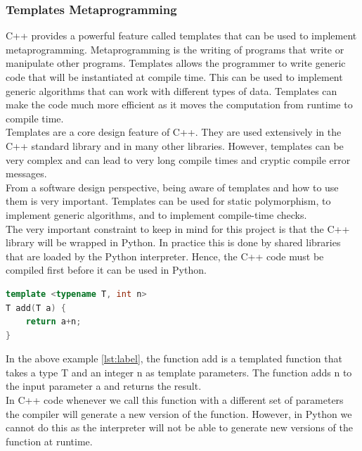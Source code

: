 \begin{spacing}{1.2}
    \subsubsection{Templates Metaprogramming}
    C++ provides a powerful feature called templates that can be used to implement metaprogramming.
    Metaprogramming is the writing of programs that write or manipulate other programs.
    Templates allows the programmer to write generic code that will be instantiated at compile time.
    This can be used to implement generic algorithms that can work with different types of data.
    Templates can make the code much more efficient as it moves the computation from runtime
    to compile time. \\

    Templates are a core design feature of C++. They are used extensively in the C++ standard
    library and in many other libraries. However, templates can be very complex and can lead to
    very long compile times and cryptic compile error messages.\\

    From a software design perspective, being aware of templates and how to use them is very
    important. Templates can be used for static polymorphism, to implement generic algorithms,
    and to implement compile-time checks.\\

    The very important constraint to keep in mind for this project is that the C++ library will
    be wrapped in Python. In practice this is done by shared libraries that are loaded by the Python
    interpreter. Hence, the C++ code must be compiled first before it can be used in Python.

    \begin{lstlisting}[language=C++,caption={Example of a Templated Function},label={lst:label}]
template <typename T, int n>
T add(T a) {
    return a+n;
}
    \end{lstlisting}

    In the above example \ref{lst:label}, the function add is a templated function that takes
    a type T and an integer n as template parameters. The function adds n to the input parameter
    a and returns the result.\\

    In C++ code whenever we call this function with a different set of parameters
    the compiler will generate a new version of the function. However, in Python we cannot do
    this as the interpreter will not be able to generate new versions of the function at runtime.\\


\end{spacing}
